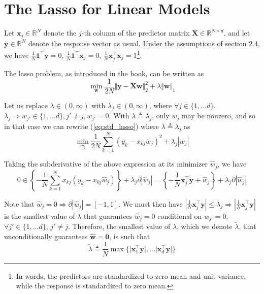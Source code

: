 \documentclass{article}
\numberwithin{equation}{section}
\begin{document}
\section{The Lasso for Linear Models}

 \label{sec:2.1}

Let $ \mathbf{x}_j  \in \mathbb{R}^N $ denote the $ j $-th column of the
predictor matrix $ \mathbf{X} \in \mathbb{R}^{N \times d} $, and let
$ \mathbf{y} \in \mathbb{R}^N $ denote the response vector as usual. Under
the assumptions of section 2.4, we have $ \frac{1}{N}\mathbf{1}^\top
\mathbf{y} = 0 $, $ \frac{1}{N}\mathbf{1}^\top\mathbf{x}_j = 0 $,
$ \frac{1}{N}\mathbf{x}_j^\top\mathbf{x}_j = 1 $\footnote{
    In words, the predictors are standardized to zero mean and unit variance,
    while the response is standardized to zero mean.
}.

\medskip

The lasso problem, as introduced in the book, can be written as
\begin{equation} \label{eq:std_lasso}
    \min_\mathbf{w}\frac{1}{2N}\Vert\mathbf{y} - \mathbf{Xw}\Vert_2^2 +
    \lambda\Vert\mathbf{w}\Vert_1
\end{equation}

Let us replace $ \lambda \in (0, \infty) $ with $ \lambda_j \in
(0, \infty) $, where $ \forall j \in \{1, \ldots d\} $, $ \lambda_j
\Rightarrow w_{j'} \in \{1, \ldots d\}, j' \ne j, w_{j'} = 0 $.
With $ \lambda \triangleq \lambda_j $, only $ w_j $ may be nonzero, and
so in that case we can rewrite (\ref{eq:std_lasso}) where
$ \lambda \triangleq \lambda_j $ as
\begin{equation*}
    \min_{w_j}\frac{1}{2N}\sum_{k = 1}^N(y_k - x_{kj}w_j)^2 +
    \lambda_j|w_j|
\end{equation*}

Taking the subderivative of the above expression at its minimizer
$ \hat{w}_j $, we have
\begin{equation*}
    0 \in \left\{
        -\frac{1}{N}\sum_{k = 1}^Nx_{kj}(y_k - x_{kj}\hat{w}_j)
    \right\} +
    \lambda_j\partial|\hat{w}_j| =
    \left\{-\frac{1}{N}\mathbf{x}_j^\top\mathbf{y} + \hat{w}_j\right\} +
    \lambda_j\partial|\hat{w}_j|
\end{equation*}

Note that $ \hat{w}_j = 0 \Rightarrow \partial|\hat{w}_j| = [-1, 1] $. We
must then have $ \left|\frac{1}{N}\mathbf{x}_j^\top\mathbf{y}\right| \le
\lambda_j \Rightarrow \left|\frac{1}{N}\mathbf{x}_j^\top\mathbf{y}\right| $
is the smallest value of $ \lambda $ that guarantees $ \hat{w}_j = 0 $
conditional on $ \hat{w}_{j'} = 0 $, $ \forall j' \in \{1, \ldots d\} $,
$ j' \ne j $. Therefore, the smallest value of $ \lambda $,
which we denote $ \tilde{\lambda} $, that unconditionally guarantees
$ \hat{\mathbf{w}} = \mathbf{0} $, is such that
\begin{equation*}
    \tilde{\lambda} \triangleq
    \frac{1}{N}\max\big\{
        \big|\mathbf{x}_1^\top\mathbf{y}\big|, \ldots
        \big|\mathbf{x}_d^\top\mathbf{y}\big|
    \big\}
\end{equation*}
\end{document}
